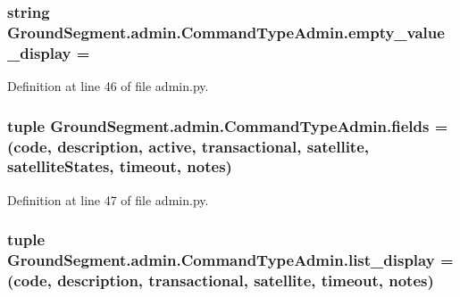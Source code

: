 \subsubsection[{empty\+\_\+value\+\_\+display}]{\setlength{\rightskip}{0pt plus 5cm}string Ground\+Segment.\+admin.\+Command\+Type\+Admin.\+empty\+\_\+value\+\_\+display = \textquotesingle{}\textquotesingle{}\hspace{0.3cm}{\ttfamily [static]}}\label{class_ground_segment_1_1admin_1_1_command_type_admin_a33d28f3ea0909e227e12b323b479cd4b}


Definition at line 46 of file admin.\+py.

\hypertarget{class_ground_segment_1_1admin_1_1_command_type_admin_a1ee0f5d0adfcd6a4daab57e600d1e6e0}{}
\subsubsection[{fields}]{\setlength{\rightskip}{0pt plus 5cm}tuple Ground\+Segment.\+admin.\+Command\+Type\+Admin.\+fields = (\textquotesingle{}code\textquotesingle{}, \textquotesingle{}description\textquotesingle{}, \textquotesingle{}active\textquotesingle{}, \textquotesingle{}transactional\textquotesingle{}, \textquotesingle{}satellite\textquotesingle{}, \textquotesingle{}satellite\+States\textquotesingle{}, \textquotesingle{}timeout\textquotesingle{}, \textquotesingle{}notes\textquotesingle{})\hspace{0.3cm}{\ttfamily [static]}}\label{class_ground_segment_1_1admin_1_1_command_type_admin_a1ee0f5d0adfcd6a4daab57e600d1e6e0}


Definition at line 47 of file admin.\+py.

\hypertarget{class_ground_segment_1_1admin_1_1_command_type_admin_a5afd80db575f5f9696c042e09a22966d}{}
\subsubsection[{list\+\_\+display}]{\setlength{\rightskip}{0pt plus 5cm}tuple Ground\+Segment.\+admin.\+Command\+Type\+Admin.\+list\+\_\+display = (\textquotesingle{}code\textquotesingle{}, \textquotesingle{}description\textquotesingle{}, \textquotesingle{}transactional\textquotesingle{}, \textquotesingle{}satellite\textquotesingle{}, \textquotesingle{}timeout\textquotesingle{}, \textquotesingle{}notes\textquotesingle{})\hspace{0.3cm}{\ttfamily [static]}}\label{class_ground_segment_1_1admin_1_1_command_type_admin_a5afd80db575f5f9696c042e09a22966d}


